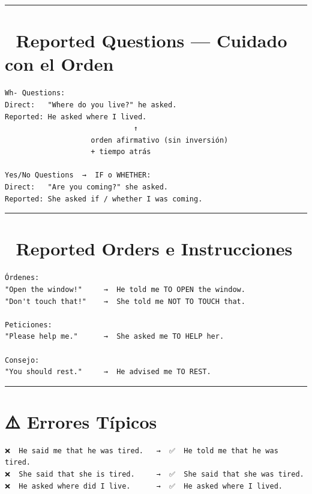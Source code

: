 \documentclass[
  spanish,
  letterpaper,
]{scrbook}
\begin{document}
\begin{center}\rule{0.5\linewidth}{0.5pt}\end{center}

\section{📐 Reported Questions --- Cuidado con el
Orden}\label{reported-questions-cuidado-con-el-orden}

\begin{verbatim}
Wh- Questions:
Direct:   "Where do you live?" he asked.
Reported: He asked where I lived.
                              ↑
                    orden afirmativo (sin inversión)
                    + tiempo atrás

Yes/No Questions  →  IF o WHETHER:
Direct:   "Are you coming?" she asked.
Reported: She asked if / whether I was coming.
\end{verbatim}

\begin{center}\rule{0.5\linewidth}{0.5pt}\end{center}

\section{📐 Reported Orders e
Instrucciones}\label{reported-orders-e-instrucciones}

\begin{verbatim}
Órdenes:
"Open the window!"     →  He told me TO OPEN the window.
"Don't touch that!"    →  She told me NOT TO TOUCH that.

Peticiones:
"Please help me."      →  She asked me TO HELP her.

Consejo:
"You should rest."     →  He advised me TO REST.
\end{verbatim}

\begin{center}\rule{0.5\linewidth}{0.5pt}\end{center}

\section{⚠️ Errores Típicos}\label{errores-tuxedpicos-4}

\begin{verbatim}
❌  He said me that he was tired.   →  ✅  He told me that he was tired.
❌  She said that she is tired.     →  ✅  She said that she was tired.
❌  He asked where did I live.      →  ✅  He asked where I lived.
\end{verbatim}
\end{document}
